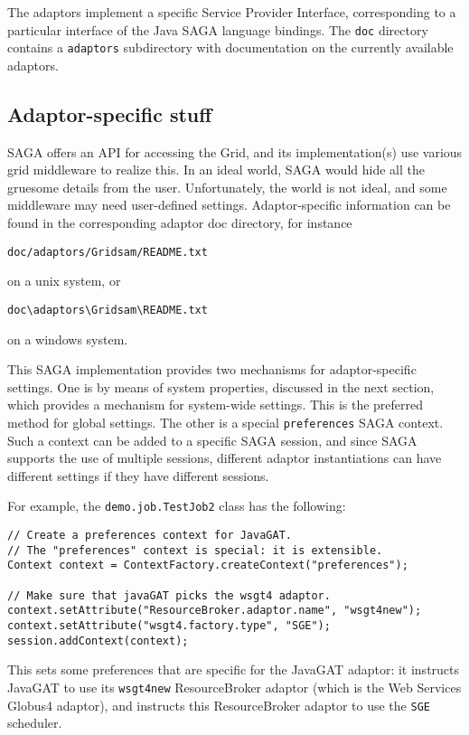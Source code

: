 \documentclass[a4paper,10pt]{article}
\begin{document}
The adaptors implement a specific Service Provider Interface,
corresponding to a particular interface of the Java SAGA language bindings.
The \texttt{doc} directory contains a \texttt{adaptors} subdirectory
with documentation on the currently available adaptors.

\subsection{Adaptor-specific stuff}

SAGA offers an API for accessing the Grid, and its implementation(s) use
various grid middleware to realize this. In an ideal world, SAGA would hide
all the gruesome details from the user. Unfortunately, the world is not
ideal, and some middleware may need user-defined settings.
Adaptor-specific information can be found in the corresponding adaptor
doc directory, for instance
\noindent
{\small
\begin{verbatim}
doc/adaptors/Gridsam/README.txt
\end{verbatim}
}
\noindent
on a unix system, or
\noindent
{\small
\begin{verbatim}
doc\adaptors\Gridsam\README.txt
\end{verbatim}
}
\noindent
on a windows system.

This SAGA implementation provides two mechanisms for adaptor-specific
settings.
One is by means of system properties, discussed in the
next section, which provides a mechanism for system-wide settings.
This is the preferred method for global settings.
The other is a special \texttt{preferences} SAGA context.
Such a context can be added to a specific SAGA session, and since SAGA
supports the use of multiple sessions, different adaptor instantiations
can have different settings if they have different sessions.

For example, the \texttt{demo.job.TestJob2} class has the following:
{\small
\begin{verbatim}
// Create a preferences context for JavaGAT.
// The "preferences" context is special: it is extensible.
Context context = ContextFactory.createContext("preferences");

// Make sure that javaGAT picks the wsgt4 adaptor.
context.setAttribute("ResourceBroker.adaptor.name", "wsgt4new");
context.setAttribute("wsgt4.factory.type", "SGE");
session.addContext(context);
\end{verbatim}
}
\noindent
This sets some preferences that are specific for the JavaGAT adaptor:
it instructs JavaGAT to use its \texttt{wsgt4new} ResourceBroker adaptor
(which is the Web Services Globus4 adaptor), and instructs this
ResourceBroker adaptor to use the \texttt{SGE} scheduler.
\end{document}
